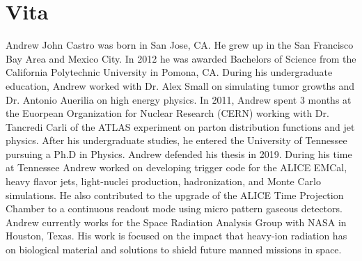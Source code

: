 \chapter*{Vita} \label{ch:vita}
Andrew John Castro was born in San Jose, CA.  He grew up in the San Francisco Bay Area and Mexico City.  In 2012 he was awarded  Bachelors of Science from the California Polytechnic University in Pomona, CA.  During his undergraduate education, Andrew worked with Dr. Alex Small on simulating tumor growths and Dr. Antonio Auerilia on high energy physics.  In 2011, Andrew spent 3 months at the Euorpean Organization for Nuclear Research (CERN) working with Dr. Tancredi Carli of the ATLAS experiment on parton distribution functions and jet physics.  
After his undergraduate studies, he entered the University of Tennessee pursuing a Ph.D in Physics.  Andrew defended his thesis in 2019.  During his time at Tennessee Andrew worked on developing trigger code for the ALICE EMCal, heavy flavor jets, light-nuclei production, hadronization, and Monte Carlo simulations.  He also contributed to the upgrade of the ALICE Time Projection Chamber to a continuous readout mode using micro pattern gaseous detectors.  
Andrew currently works for the Space Radiation Analysis Group with NASA in Houston, Texas. His work is focused on the impact that heavy-ion radiation has on biological material and solutions to shield future manned missions in space.
